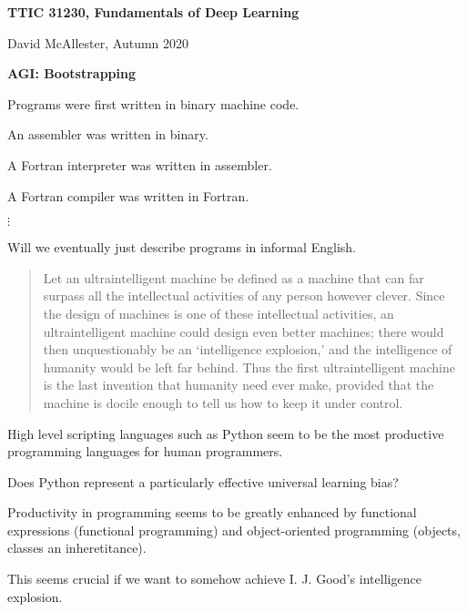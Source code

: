 




{\Huge

  \centerline{\bf TTIC 31230, Fundamentals of Deep Learning}
  \bigskip
  \centerline{David McAllester, Autumn 2020}

\vfill
  \centerline{\bf AGI: Bootstrapping}
  \vfill
  \vfill


Programs were first written in binary machine code.

\vfill
An assembler was written in binary.

\vfill
A Fortran interpreter was written in assembler.

\vfill
A Fortran compiler was written in Fortran.

\vfill
$\vdots$

\vfill
Will we eventually just describe programs in informal English.

\vfill
\begin{quotation}
Let an ultraintelligent machine be defined as a machine that can far surpass all the intellectual activities of any person however clever. Since the design of machines is one of these intellectual activities, an ultraintelligent machine could design even better machines; there would then unquestionably be an ‘intelligence explosion,’ and the intelligence of humanity would be left far behind. Thus the first ultraintelligent machine is the last invention that humanity need ever make, provided that the machine is docile enough to tell us how to keep it under control.
\end{quotation}

\vfill
{}



High level scripting languages such as Python seem to be the most productive programming languages for human programmers.

\vfill
Does Python represent a particularly effective universal learning bias?

\vfill
Productivity in programming seems to be greatly enhanced by functional expressions (functional programming) and object-oriented programming
(objects, classes an inheretitance).

\vfill
This seems crucial if we want to somehow achieve I. J. Good's intelligence explosion.


}
